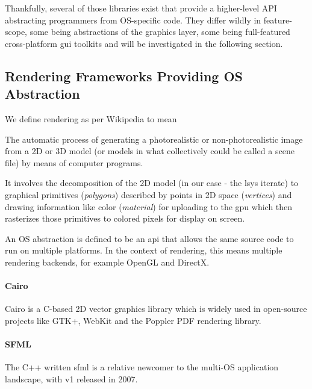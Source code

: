 Thankfully, several of those libraries exist that provide a higher-level API abstracting programmers from OS-specific code. They differ wildly in feature-scope, some being abstractions of the graphics layer, some being full-featured cross-platform \gls{gui} toolkits and will be investigated in the following section.

\subsection{Rendering Frameworks Providing OS Abstraction}
\label{sec:res_frameworks}

We define rendering as per Wikipedia to mean
\begin{definition}[Rendering]
The automatic process of generating a photorealistic or non-photorealistic image from a 2D or 3D model (or models in what collectively could be called a scene file) by means of computer programs.
\end{definition}
It involves the decomposition of the 2D model (in our case - the \gls{lsys} iterate) to graphical primitives (\textit{polygons}) described by points in 2D space (\textit{vertices}) and drawing information like color (\textit{material}) for uploading to the \gls{gpu} which then rasterizes those primitives to colored pixels for display on screen.

An OS abstraction is defined to be an \gls{api} that allows the same source code to run on multiple platforms. In the context of rendering, this means multiple rendering backends, for example OpenGL and DirectX.

\paragraph{Cairo}
\label{sec:cairo}
Cairo is a C-based 2D vector graphics library which is widely used in open-source projects like GTK+, WebKit and the Poppler PDF rendering library.

\paragraph{SFML}
The C++ written \gls{sfml} is a relative newcomer to the multi-OS application landscape, with v1 released in 2007.

